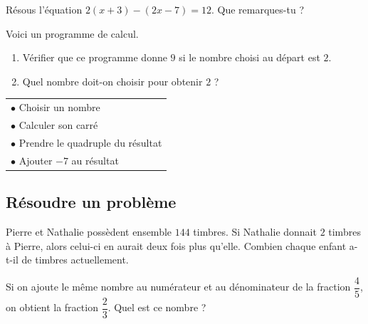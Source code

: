 \documentclass[a4paper,10pt]{report}
\begin{document}
\begin{ex}
Résous l'équation $2(x+3)-(2x-7)=12$. Que remarques-tu ?
\end{ex}

\begin{ex}
Voici un programme de calcul.

\noindent \begin{minipage}{9cm}
\begin{enumerate}[font=\color{exer2}]
\item Vérifier que ce programme donne $9$ si le nombre choisi au départ est $2$. 
\item Quel nombre doit-on choisir pour obtenir $2$ ?
\end{enumerate}
\end{minipage}
\hspace{5mm}
\begin{minipage}{7cm}
\begin{center}
\begin{tabular}{|p{5.5cm}|}
\hline
$\bullet$ Choisir un nombre\\
$\bullet$ Calculer son carré\\
$\bullet$ Prendre le quadruple du résultat\\
$\bullet$ Ajouter $-7$ au résultat\\
\hline
\end{tabular}
\end{center}
\end{minipage}
\end{ex}

\vspace{-3mm}
\subsection*{Résoudre un problème}

\vspace{-3mm}
\begin{ex}
Pierre et Nathalie possèdent ensemble $144$ timbres. Si Nathalie donnait $2$ timbres à Pierre, alors celui-ci en aurait deux fois plus qu'elle. Combien chaque enfant a-t-il de timbres actuellement.
\end{ex}

\begin{ex}

\vspace{-2.4mm}\hspace{1.8cm} Si on ajoute le même nombre au numérateur et au dénominateur de la fraction $\dfrac{4}{5}$, on obtient la fraction $\dfrac{2}{3}$. Quel est ce nombre ?
\end{ex}
\end{document}
